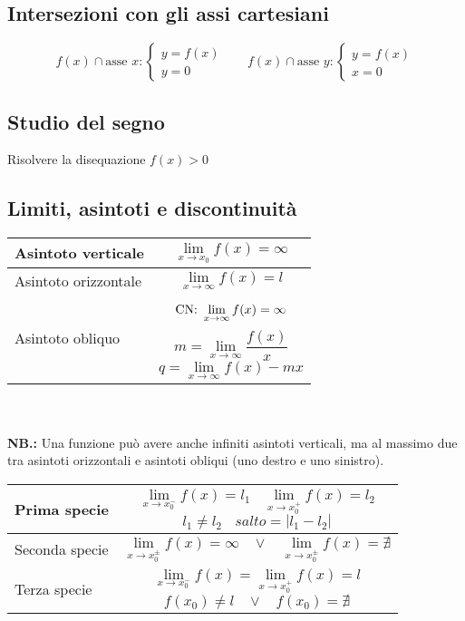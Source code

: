     \subsection{Intersezioni con gli assi cartesiani}
    \[f(x) \cap \text{asse~}x : \left\{\begin{array}{l}
         y=f(x)  \\
         y=0 
    \end{array}\right.~~~~~~~~ 
    f(x) \cap \text{asse~}y : \left\{\begin{array}{l}
         y=f(x)  \\
         x=0 
    \end{array}\right.\] 
    \subsection{Studio del segno}
    Risolvere la disequazione $f(x)>0$
    \subsection{Limiti, asintoti e discontinuità}
    \begin{tabular}{|m{}|m{}|}
        \hline
        Asintoto verticale&  \[\lim_{x\rightarrow x_0} f(x) = \infty\] \\\hline
        Asintoto orizzontale & \[\lim_{x\rightarrow \infty} f(x) = l\]\\ \hline
        Asintoto obliquo & \[\textnormal{CN: }\lim_{x\rightarrow\infty}f(x) = \infty\]
        \[m=\lim_{x\rightarrow\infty}\frac{f(x)}{x}\]
        \[q=\lim_{x\rightarrow\infty}f(x)-mx\] \\ \hline
    \end{tabular}\\
    \\
    \textbf{NB.:} Una funzione può avere anche infiniti asintoti verticali, ma al massimo due tra asintoti orizzontali e asintoti obliqui (uno destro e uno sinistro).\\    \begin{tabular}{|m{}|m{}|}
        \hline
        Prima specie &  \[\lim_{x\rightarrow x_0^-}f(x)=l_1~~~~\lim_{x\rightarrow x_0^+}f(x)=l_2\] \[l_1\neq l_2~~~~salto=|l_1-l_2|\]\\ \hline
        Seconda specie &  \[\lim_{x\rightarrow x_0^\pm}f(x)=\infty ~~~~\lor~~~~ \lim_{x\rightarrow x_0^\pm}f(x)=\nexists\] \\\hline
        Terza specie & \[\lim_{x\rightarrow x_0^-}f(x)=\lim_{x\rightarrow x_0^+}f(x)=l\]\[f(x_0)\neq l ~~~~ \lor ~~~~ f(x_0)=\nexists\]\\ \hline
    \end{tabular}
